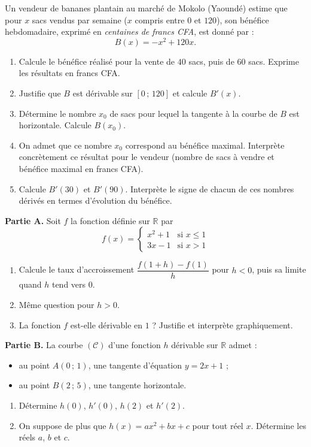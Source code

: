 \documentclass[11pt]{article}
\begin{document}
\begin{exercice}
Un vendeur de bananes plantain au marché de Mokolo (Yaoundé) estime que pour $x$ sacs vendus par semaine ($x$ compris entre $0$ et $120$), son bénéfice hebdomadaire, exprimé en \emph{centaines de francs CFA}, est donné par :
\[ B(x)=-x^2+120x. \]
\begin{enumerate}
\item Calcule le bénéfice réalisé pour la vente de $40$ sacs, puis de $60$ sacs. Exprime les résultats en francs CFA.
\item Justifie que $B$ est dérivable sur $[0\,;\,120]$ et calcule $B'(x)$.
\item Détermine le nombre $x_0$ de sacs pour lequel la tangente à la courbe de $B$ est horizontale. Calcule $B(x_0)$.
\item On admet que ce nombre $x_0$ correspond au bénéfice maximal. Interprète concrètement ce résultat pour le vendeur (nombre de sacs à vendre et bénéfice maximal en francs CFA).
\item Calcule $B'(30)$ et $B'(90)$. Interprète le signe de chacun de ces nombres dérivés en termes d'évolution du bénéfice.
\end{enumerate}
\end{exercice}

\begin{exercice}
\textbf{Partie A.} Soit $f$ la fonction définie sur $\mathbb{R}$ par
\[ f(x)=\begin{cases} x^2+1 & \text{si } x\leq 1 \\ 3x-1 & \text{si } x>1 \end{cases} \]
\begin{enumerate}
\item Calcule le taux d'accroissement $\dfrac{f(1+h)-f(1)}{h}$ pour $h<0$, puis sa limite quand $h$ tend vers $0$.
\item Même question pour $h>0$.
\item La fonction $f$ est-elle dérivable en $1$ ? Justifie et interprète graphiquement.
\end{enumerate}
\textbf{Partie B.} La courbe $(\mathcal{C})$ d'une fonction $h$ dérivable sur $\mathbb{R}$ admet :
\begin{itemize}
\item au point $A(0\,;\,1)$, une tangente d'équation $y=2x+1$ ;
\item au point $B(2\,;\,5)$, une tangente horizontale.
\end{itemize}
\begin{enumerate}
\item Détermine $h(0)$, $h'(0)$, $h(2)$ et $h'(2)$.
\item On suppose de plus que $h(x)=ax^2+bx+c$ pour tout réel $x$. Détermine les réels $a$, $b$ et $c$.
\end{enumerate}
\end{exercice}
\end{document}
